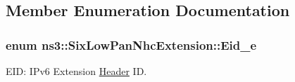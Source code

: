 \subsection{Member Enumeration Documentation}
\subsubsection[{\texorpdfstring{Eid\+\_\+e}{Eid_e}}]{\setlength{\rightskip}{0pt plus 5cm}enum {\bf ns3\+::\+Six\+Low\+Pan\+Nhc\+Extension\+::\+Eid\+\_\+e}}\hypertarget{classns3_1_1SixLowPanNhcExtension_ac692a22abe80c30bcbafa57ef36bf5ad}{}\label{classns3_1_1SixLowPanNhcExtension_ac692a22abe80c30bcbafa57ef36bf5ad}


E\+ID\+: I\+Pv6 Extension \hyperlink{classns3_1_1Header}{Header} ID. 


